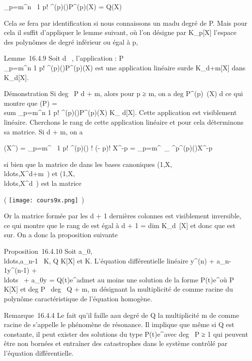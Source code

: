 \documentclass[]{article}
\begin{document}
\sum \_p=m^n~ 1
\over p! \chi^(p)(\mu)P^(p)(X) = Q(X)

Cela se fera par identification si nous connaissons un ma\jmathorant du degré
de P. Mais pour cela il suffit d'appliquer le lemme suivant, où l'on
désigne par K\_p{[}X{]} l'espace des polynômes de degré
inférieur ou égal à p,

Lemme~16.4.9 Soit d \in {}~, l'application \theta :
P\mapsto~\\\sum
 \_p=m^n 1 \over p!
\chi^(p)(\mu)P^(p)(X) est une application linéaire
sur\jmathective de K\_d+m{[}X{]} dans K\_d{[}X{]}.

Démonstration Si deg~ P \leq d + m, alors pour p ≥
m, on a deg P^(p)~(X) \leq d ce qui
montre que \theta(P) =\ \\sum
 \_p=m^n 1 \over p!
\chi^(p)(\mu)P^(p)(X) \in K\_ d{[}X{]}. Cette
application est visiblement linéaire. Cherchons le rang de cette
application linéaire et pour cela déterminons sa matrice. Si \jmath \leq d + m,
on a

\theta(X^\jmath) = \sum \_p=m^\jmath~
1 \over p! \chi^(p)(\mu) \jmath!
\over (\jmath - p)! X^\jmath-p =
\sum \_p=m^\jmathC~\_
\jmath^p\chi^(p)(\mu)X^\jmath-p

si bien que la matrice de \theta dans les bases canoniques
(1,X,\\ldots,X^d+m~)
et
(1,X,\\ldots,X^d~)
est la matrice

\left ( \texttt{[image: cours9x.png]}
\,\right )

Or la matrice formée par les d + 1 dernières colonnes est visiblement
inversible, ce qui montre que le rang de \theta est égal à d + 1
= dim K\_d~{[}X{]} et donc que \theta est
sur\jmathective. On a donc la proposition suivante

Proposition~16.4.10 Soit
a\_0,\\ldots,a\_n-1~
\in K, Q \in K{[}X{]} et \mu \in K. L'équation différentielle linéaire
y^(n) + a\_n-1y^(n-1) +
\\ldots~ +
a\_0y = Q(t)e^\mut admet au moins une solution de la
forme P(t)e^\mut où P \in K{[}X{]} et
deg P \leq\ deg~ Q + m, m
désignant la multiplicité de \mu comme racine du polynôme caractéristique
de l'équation homogène.

Remarque~16.4.4 Le fait qu'il faille a\jmathouter au degré de Q la
multiplicité m de \mu comme racine de \chi s'appelle le phénomène de
résonance. Il implique que même si Q est constante, il peut exister des
solutions du type P(t)e^\mut avec deg~
P ≥ 1 qui peuvent être non bornées et entraîner des catastrophes dans le
système contrôlé par l'équation différentielle.
\end{document}
